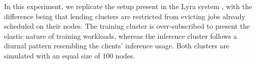 \begin{center}
\end{center}

In this experiment, we replicate the setup present in the Lyra system
\cite{li_lyra_2023}, with the difference being that lending clusters are
restricted from evicting jobs already scheduled on their nodes. The training
cluster is over-subscribed to present the elastic nature of training workloads,
whereas the inference cluster follows a diurnal pattern resembling the clients'
inference usage. Both clusters are simulated with an equal size of 100 nodes.  

